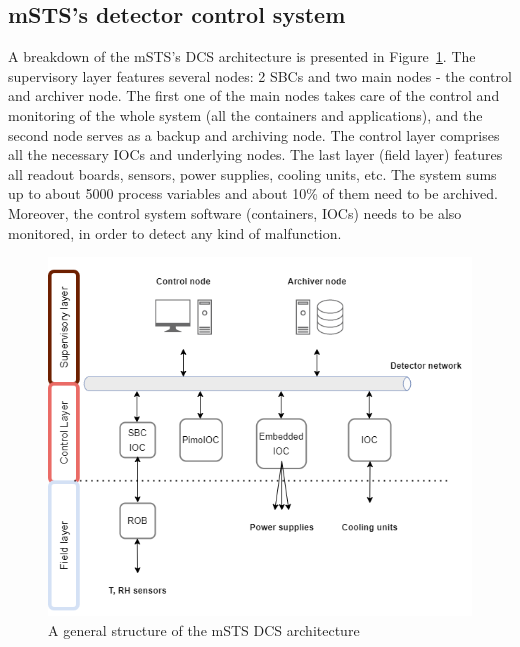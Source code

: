\subsection{mSTS's detector control system}
A breakdown of the \gls{mSTS}'s \gls{DCS} architecture is presented in Figure~\ref{fig_mstsarch}. The supervisory layer features several nodes: 2 \glspl{SBC} and two main nodes - the control and archiver node. The first one of the main nodes takes care of the control and monitoring of the whole system (all the containers and applications), and the second node serves as a backup and archiving node. The control layer comprises all the necessary \glspl{IOC} and underlying nodes. The last layer (field layer) features all readout boards, sensors, power supplies, cooling units, etc. The system sums up to about 5000 process variables and about 10\% of them need to be archived. Moreover, the control system software (containers, \glspl{IOC}) needs to be also monitored, in order to detect any kind of malfunction. 

\begin{figure}[!h]
\centering
\includegraphics[width=0.55\columnwidth]{Chapter5/DCS/images/mcbmpng.png}
\caption{A general structure of the \gls{mSTS} \gls{DCS} architecture}
\label{fig_mstsarch}
\end{figure}

